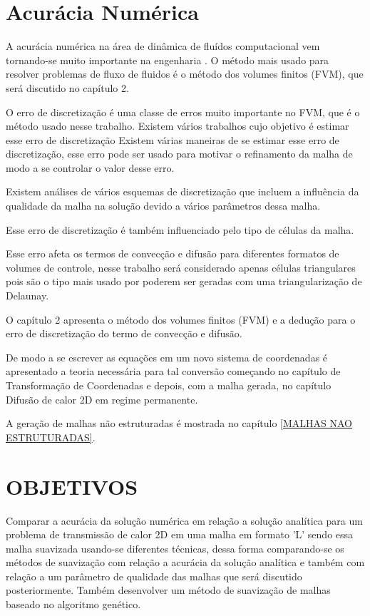 \section{Acurácia Numérica}
A acurácia numérica na área de dinâmica de fluídos computacional vem tornando-se muito importante na engenharia \cite{doi:10.1080/10407791003685155}. O método mais usado para resolver problemas de fluxo de fluidos é o método dos volumes finitos (FVM), que será discutido no capítulo 2.

O erro de discretização é uma classe de erros muito importante no FVM, que é o método usado nesse trabalho. Existem vários trabalhos cujo objetivo é estimar esse erro de discretização \cite{Muzaferija2014} \cite{Jasak1996} Existem várias maneiras de se estimar esse erro de discretização, esse erro pode ser usado para motivar o refinamento da malha de modo a se controlar o valor desse erro.

Existem análises de vários esquemas de discretização que incluem a influência da qualidade da malha na solução devido a vários parâmetros dessa malha.

Esse erro de discretização é também influenciado pelo tipo de células da malha. \cite{doi:10.1080/10407791003685155}

Esse erro afeta os termos de convecção e difusão para diferentes formatos de volumes de controle, nesse trabalho será considerado apenas células triangulares pois são o tipo mais usado por poderem ser geradas com uma triangularização de Delaunay.

O capítulo 2 apresenta o método dos volumes finitos (FVM) e a dedução para o erro de discretização do termo de convecção e difusão.

De modo a se escrever as equações em um novo sistema de coordenadas é apresentado a teoria necessária para tal conversão começando no capítulo de Transformação de Coordenadas e depois, com a malha gerada, no capítulo Difusão de calor 2D em regime permanente.

A geração de malhas não estruturadas é mostrada no capítulo \ref{MALHAS NAO ESTRUTURADAS}.

\section{OBJETIVOS}

Comparar a acurácia da solução numérica em relação a solução analítica para um problema de transmissão de calor 2D em uma malha em formato 'L' sendo essa malha suavizada usando-se diferentes técnicas, dessa forma comparando-se os métodos de suavização com relação a acurácia da solução analítica e também com relação a um parâmetro de qualidade das malhas que será discutido posteriormente.
Também desenvolver um método de suavização de malhas baseado no algoritmo genético.

